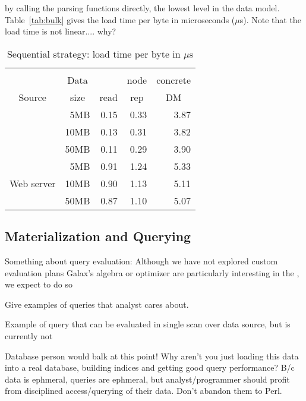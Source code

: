  by calling the \pads{} parsing functions directly, \ie{}
the lowest level in the \padx{} data model.  Table~\ref{tab:bulk}
gives the load time per byte in microseconds ($\mu$s).  Note that the
load time is not linear.... why?
\begin{table}
\begin{center}
\begin{tabular}{c|r|r|r|r}
           &                            &                      &  \multicolumn{1}{c|}{\padx{}}   &  \multicolumn{1}{c}{\padx{}} \\
           & \multicolumn{1}{c|}{Data}  & \multicolumn{1}{c|}{\pads{}} & \multicolumn{1}{c|}{node}&  \multicolumn{1}{c}{concrete} \\
Source     & \multicolumn{1}{c|}{size}  &  \multicolumn{1}{c|}{read}   & \multicolumn{1}{c|}{rep} &  \multicolumn{1}{c}{DM}  \\ \hline
           &  5MB  &  0.15   & 0.33    & 3.87 \\
\dibbler{} & 10MB  &  0.13   & 0.31    & 3.82 \\
           & 50MB  &  0.11   & 0.29    & 3.90\\ \hline
           &  5MB  &  0.91   & 1.24    & 5.33 \\
Web server & 10MB  &  0.90   & 1.13    & 5.11 \\
           & 50MB  &  0.87   & 1.10    & 5.07 \\
\end{tabular}
\end{center}
\caption{Sequential strategy: load time per byte in $\mu$s}
\label{tab:linear}
\end{table}

\subsection{Materialization and Querying}

Something about query evaluation:
Although we have not explored custom evaluation plans 
Galax's algebra or optimizer are particularly interesting in the 
\padx{}, we expect to do so 

Give examples of queries that analyst cares about. 

Example of query that can be evaluated in single scan over data
source, but is currently not 

Database person would balk at this point!  Why aren't you just loading
this data into a real database, building indices and getting good
query performance?  B/c data is ephmeral, queries are ephmeral, but
analyst/programmer should profit from disciplined access/querying of
their data.  Don't abandon them to Perl. 


